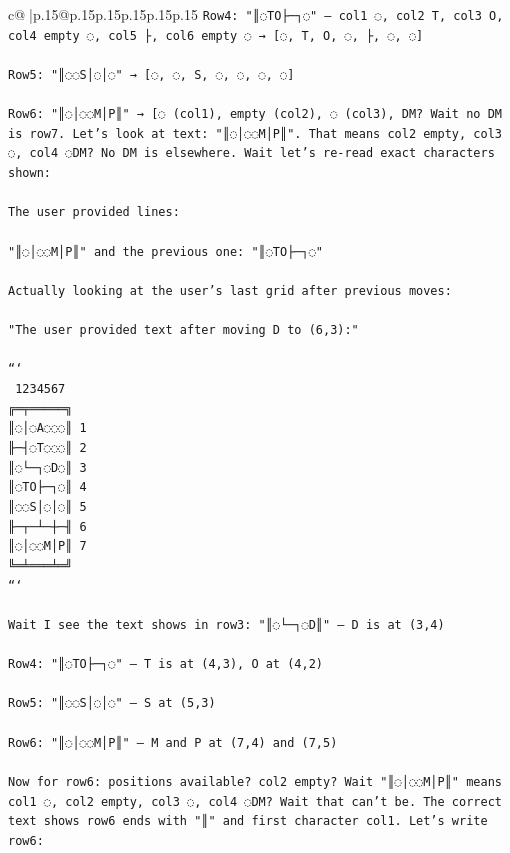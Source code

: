 \documentclass{article}
\begin{document}
{\begin{supertabular}{c@{$\;$}|p{.15\linewidth}@{}p{.15\linewidth}p{.15\linewidth}p{.15\linewidth}p{.15\linewidth}p{.15\linewidth}}
{{{\texttt{Row4: "║◌TO├─┐◌" — col1 ◌, col2 T, col3 O, col4 empty ◌, col5 ├, col6 empty ◌ → {[}◌, T, O, ◌, ├, ◌, ◌{]}} \\
\\ 
\texttt{Row5: "║◌◌S│◌│◌" → {[}◌, ◌, S, ◌, ◌, ◌, ◌{]}} \\
\\ 
\texttt{Row6: "║◌│◌◌M│P║" → {[}◌ (col1), empty (col2), ◌ (col3), DM? Wait no DM is row7. Let's look at text: "║◌│◌◌M│P║". That means col2 empty, col3 ◌, col4 ◌DM? No DM is elsewhere. Wait let's re{-}read exact characters shown:} \\
\\ 
\texttt{The user provided lines:} \\
\\ 
\texttt{"║◌│◌◌M│P║" and the previous one: "║◌TO├─┐◌"} \\
\\ 
\texttt{Actually looking at the user's last grid after previous moves:} \\
\\ 
\texttt{"The user provided text after moving D to (6,3):"} \\
\\ 
\texttt{```} \\
\texttt{ 1234567} \\
\texttt{╔═╤═════╗} \\
\texttt{║◌│◌A◌◌◌║ 1} \\
\texttt{╟─┤◌T◌◌◌║ 2} \\
\texttt{║◌└─┐◌D◌║ 3} \\
\texttt{║◌TO├─┐◌║ 4} \\
\texttt{║◌◌S│◌│◌║ 5} \\
\texttt{╟─┬─┴─┼─╢ 6} \\
\texttt{║◌│◌◌M│P║ 7} \\
\texttt{╚═╧═══╧═╝} \\
\texttt{```} \\
\\ 
\texttt{Wait I see the text shows in row3: "║◌└─┐◌D║" — D is at (3,4)} \\
\\ 
\texttt{Row4: "║◌TO├─┐◌" — T is at (4,3), O at (4,2)} \\
\\ 
\texttt{Row5: "║◌◌S│◌│◌" — S at (5,3)} \\
\\ 
\texttt{Row6: "║◌│◌◌M│P║" — M and P at (7,4) and (7,5)} \\
\\ 
\texttt{Now for row6: positions available? col2 empty? Wait "║◌│◌◌M│P║" means col1 ◌, col2 empty, col3 ◌, col4 ◌DM? Wait that can't be. The correct text shows row6 ends with "║" and first character col1. Let's write row6:} \\
}}}
\end{supertabular}}
\end{document}
